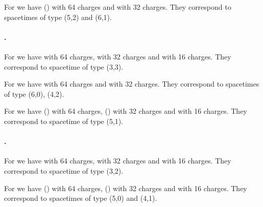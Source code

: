 \documentclass[a4paper,12pt]{article}
\begin{document}
\smallskip

\noindent  For \coordHE{} we have \coordHE{} (\coordHE{})
with 64 charges and \coordHE{} with 32 charges. They
correspond to  spacetimes of type (5,2) and (6,1).

\paragraph{\coordHE{}.} For \coordHE{} we have \coordHE{} with 64
charges, \coordHE{} with 32 charges and \coordHE{} with 16
charges. They correspond to spacetime of type (3,3).

\smallskip

\noindent For \coordHE{} we have \coordHE{} with 64
charges and \coordHE{} with 32 charges. They correspond to
spacetimes of type (6,0), (4,2).

\smallskip

\noindent For \coordHE{} we have \coordHE{} (\coordHE{})
with 64 charges, \coordHE{} (\coordHE{}) with 32 charges
and \coordHE{} with 16 charges. They correspond to spacetime
of type (5,1).

 \paragraph{\coordHE{}.}For \coordHE{} we have \coordHE{}  with 64 charges, \coordHE{}
 with 32 charges and \coordHE{} with 16 charges. They
 correspond to
spacetime of type (3,2).

\smallskip

\noindent  For \coordHE{} we have \coordHE{} (\coordHE{})
with 64 charges, \coordHE{} (\coordHE{}) with 32 charges
and \coordHE{} with 16 charges. They correspond to spacetimes
of type (5,0) and (4,1).
\end{document}
